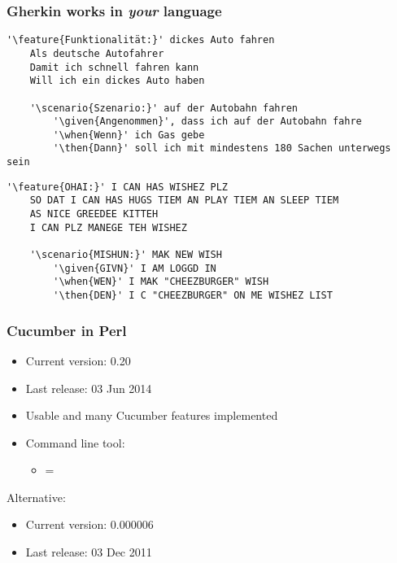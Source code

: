 \documentclass[10pt]{vcs_beamer}
\newcommand{\feature}[1]{\color{BlueViolet}{#1}}
\newcommand{\scenario}[1]{\color{BlueViolet}{#1}}
\newcommand{\given}[1]{\color{DarkOrange}{#1}}
\newcommand{\when}[1]{\color{RoyalBlue}{#1}}
\newcommand{\then}[1]{\color{ForestGreen}{#1}}
\begin{document}
\begin{frame}[fragile]
\frametitle{Gherkin works in \emph{your} language}

\begin{lstlisting}[escapeinside='']
'\feature{Funktionalität:}' dickes Auto fahren
    Als deutsche Autofahrer
    Damit ich schnell fahren kann
    Will ich ein dickes Auto haben

    '\scenario{Szenario:}' auf der Autobahn fahren
        '\given{Angenommen}', dass ich auf der Autobahn fahre
        '\when{Wenn}' ich Gas gebe
        '\then{Dann}' soll ich mit mindestens 180 Sachen unterwegs sein
\end{lstlisting}


\begin{lstlisting}[escapeinside='']
'\feature{OHAI:}' I CAN HAS WISHEZ PLZ
    SO DAT I CAN HAS HUGS TIEM AN PLAY TIEM AN SLEEP TIEM
    AS NICE GREEDEE KITTEH
    I CAN PLZ MANEGE TEH WISHEZ

    '\scenario{MISHUN:}' MAK NEW WISH
        '\given{GIVN}' I AM LOGGD IN
        '\when{WEN}' I MAK "CHEEZBURGER" WISH
        '\then{DEN}' I C "CHEEZBURGER" ON ME WISHEZ LIST
\end{lstlisting}

\end{frame}

\begin{frame}
    \frametitle{Cucumber in Perl}

    \begin{itemize}
        \item Current version: 0.20
        \item Last release: 03 Jun 2014
        \item Usable and many Cucumber features implemented
        \item Command line tool: 
            \begin{itemize}
                \item {} = 
            \end{itemize}
    \end{itemize}

    Alternative: 
    \begin{itemize}
        \item Current version: 0.000006
        \item Last release: 03 Dec 2011
    \end{itemize}

\end{frame}
\end{document}
